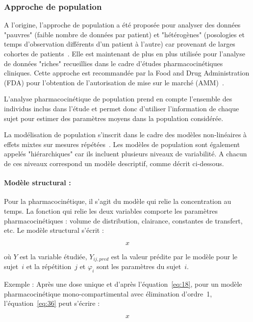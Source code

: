 \subsubsection{Approche de population}
A l'origine, l'approche de population a été proposée pour analyser des données "pauvres" (faible nombre de données par patient) et "hétérogènes" (posologies et temps d'observation différents d'un patient à l'autre) car provenant de larges cohortes de patients~\citep{REF8}. Elle est maintenant de plus en plus utilisée pour l'analyse de données "riches" recueillies dans le cadre d'études pharmacocinétiques cliniques. Cette approche est recommandée par la Food and Drug Administration (FDA) pour l'obtention de l'autorisation de mise sur le marché (AMM)~\citep{REF9}.

L'analyse pharmacocinétique de population prend en compte l'ensemble des individus inclus dans l'étude et permet donc d'utiliser l'information de chaque sujet pour estimer des paramètres moyens dans la population considérée.

La modélisation de population s'inscrit dans le cadre des modèles non-linéaires à effets mixtes sur mesures répétées~\citep{REF10}. Les modèles de population sont également appelés "hiérarchiques" car ils incluent plusieurs niveaux de variabilité. A chacun de ces niveaux correspond un modèle descriptif, comme décrit ci-dessous.

\paragraph*{Modèle structural :} Pour la pharmacocinétique, il s'agit du modèle qui relie la concentration au temps. La fonction qui relie les deux variables comporte les paramètres pharmacocinétiques : volume de distribution, clairance, constantes de transfert, etc. Le modèle structural s'écrit :

\begin{equation}
x
\label{eq:36}
\end{equation}

où $Y$ est la variable étudiée, $Y_{ij,pred}$ est la valeur prédite par le modèle pour le sujet~$i$ et la répétition~$j$ et $\varphi_i$ sont les paramètres du sujet~$i$.

Exemple : Après une dose unique et d'après l'équation~\ref{eq:18}, pour un modèle pharmacocinétique mono-compartimental avec élimination d'ordre~1, l'équation~\ref{eq:36} peut s'écrire :

\begin{equation}
x
\label{eq:37}
\end{equation}

